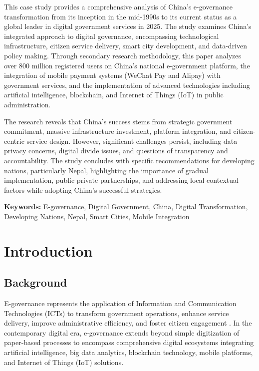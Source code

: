 \documentclass[12pt,a4paper]{article}
\begin{document}
This case study provides a comprehensive analysis of China's e-governance transformation from its inception in the mid-1990s to its current status as a global leader in digital government services in 2025. The study examines China's integrated approach to digital governance, encompassing technological infrastructure, citizen service delivery, smart city development, and data-driven policy making. Through secondary research methodology, this paper analyzes over 800 million registered users on China's national e-government platform, the integration of mobile payment systems (WeChat Pay and Alipay) with government services, and the implementation of advanced technologies including artificial intelligence, blockchain, and Internet of Things (IoT) in public administration.

The research reveals that China's success stems from strategic government commitment, massive infrastructure investment, platform integration, and citizen-centric service design. However, significant challenges persist, including data privacy concerns, digital divide issues, and questions of transparency and accountability. The study concludes with specific recommendations for developing nations, particularly Nepal, highlighting the importance of gradual implementation, public-private partnerships, and addressing local contextual factors while adopting China's successful strategies.

\textbf{Keywords:} E-governance, Digital Government, China, Digital Transformation, Developing Nations, Nepal, Smart Cities, Mobile Integration

\newpage

\section{Introduction}

\subsection{Background}

E-governance represents the application of Information and Communication Technologies (ICTs) to transform government operations, enhance service delivery, improve administrative efficiency, and foster citizen engagement \cite{GovCN2024}. In the contemporary digital era, e-governance extends beyond simple digitization of paper-based processes to encompass comprehensive digital ecosystems integrating artificial intelligence, big data analytics, blockchain technology, mobile platforms, and Internet of Things (IoT) solutions.
\end{document}
